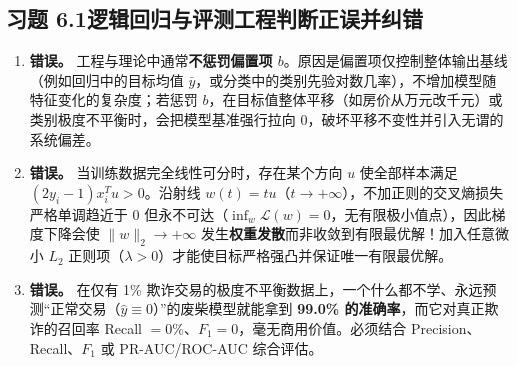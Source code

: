 \subsection*{习题 6.1\quad 逻辑回归与评测工程判断正误并纠错}
\begin{enumerate}[label=(\alph*), leftmargin=1.8em]
  \item \textbf{错误。} 工程与理论中通常\textbf{不惩罚偏置项 $b$}。原因是偏置项仅控制整体输出基线（例如回归中的目标均值 $\bar{y}$，或分类中的类别先验对数几率），不增加模型随特征变化的复杂度；若惩罚 $b$，在目标值整体平移（如房价从万元改千元）或类别极度不平衡时，会把模型基准强行拉向 $0$，破坏平移不变性并引入无谓的系统偏差。
  \item \textbf{错误。} 当训练数据完全线性可分时，存在某个方向 $u$ 使全部样本满足 $(2y_i - 1)x_i^T u > 0$。沿射线 $w(t) = t u$（$t \to +\infty$），不加正则的交叉熵损失严格单调趋近于 $0$ 但永不可达（$\inf_w \mathcal{L}(w) = 0$，无有限极小值点），因此梯度下降会使 $\|w\|_2 \to +\infty$ 发生\textbf{权重发散}而非收敛到有限最优解！加入任意微小 $L_2$ 正则项（$\lambda > 0$）才能使目标严格强凸并保证唯一有限最优解。
  \item \textbf{错误。} 在仅有 1\% 欺诈交易的极度不平衡数据上，一个什么都不学、永远预测“正常交易（$\hat{y}\equiv 0$）”的废柴模型就能拿到 \textbf{99.0\% 的准确率}，而它对真正欺诈的召回率 Recall $= 0\%$、$F_1 = 0$，毫无商用价值。必须结合 Precision、Recall、$F_1$ 或 PR-AUC/ROC-AUC 综合评估。
\end{enumerate}

